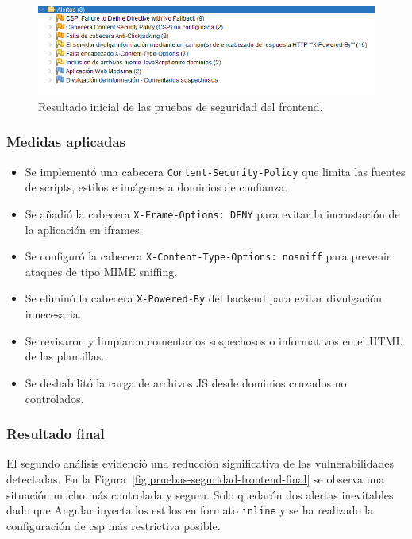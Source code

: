 \begin{figure}[h!tb]
    \centering
    \includegraphics[width=1\textwidth]{figs/alertas_previo_front.png}
    \caption{Resultado inicial de las pruebas de seguridad del frontend.\label{fig:pruebas-seguridad-frontend}}
\end{figure}

\subsubsection{Medidas aplicadas}
\begin{itemize}
    \item Se implementó una cabecera \texttt{Content-Security-Policy} que limita las fuentes de scripts, estilos e imágenes a dominios de confianza.
    \item Se añadió la cabecera \texttt{X-Frame-Options: DENY} para evitar la incrustación de la aplicación en iframes.
    \item Se configuró la cabecera \texttt{X-Content-Type-Options: nosniff} para prevenir ataques de tipo MIME sniffing.
    \item Se eliminó la cabecera \texttt{X-Powered-By} del backend para evitar divulgación innecesaria.
    \item Se revisaron y limpiaron comentarios sospechosos o informativos en el HTML de las plantillas.
    \item Se deshabilitó la carga de archivos JS desde dominios cruzados no controlados.
\end{itemize}


\subsubsection{Resultado final}
El segundo análisis evidenció una reducción significativa de las vulnerabilidades detectadas. En la Figura~\ref{fig:pruebas-seguridad-frontend-final} se observa una situación mucho más controlada y segura. Solo quedarón dos alertas inevitables dado que Angular inyecta los estilos en formato \texttt{inline} y se ha realizado la configuración de \gls{csp} más restrictiva posible.

